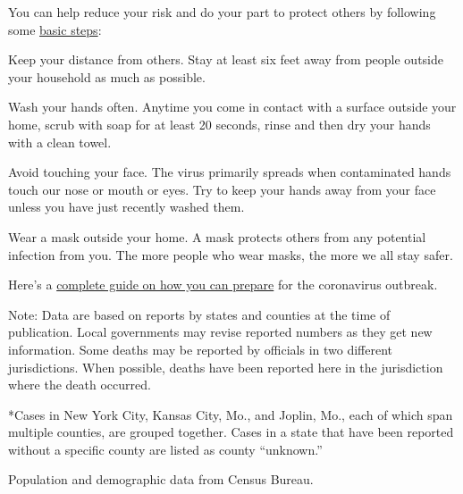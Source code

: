 You can help reduce your risk and do your part to protect others by
following some
\href{https://www.nytimes.com/article/prepare-for-coronavirus.html?action=click\&pgtype=Article\&state=default\&module=styln-coronavirus\&variant=show®ion=TOP_BANNER\&context=storyline_menu\#link-56871453}{basic
steps}:

Keep your distance from others. Stay at least six feet away from people
outside your household as much as possible.

Wash your hands often. Anytime you come in contact with a surface
outside your home, scrub with soap for at least 20 seconds, rinse and
then dry your hands with a clean towel.

Avoid touching your face. The virus primarily spreads when contaminated
hands touch our nose or mouth or eyes. Try to keep your hands away from
your face unless you have just recently washed them.

Wear a mask outside your home. A mask protects others from any potential
infection from you. The more people who wear masks, the more we all stay
safer.

Here's a
\href{https://www.nytimes.com/interactive/2020/world/coronavirus-tips-advice.html}{complete
guide on how you can prepare} for the coronavirus outbreak.

Note: Data are based on reports by states and counties at the time of
publication. Local governments may revise reported numbers as they get
new information. Some deaths may be reported by officials in two
different jurisdictions. When possible, deaths have been reported here
in the jurisdiction where the death occurred.

*Cases in New York City, Kansas City, Mo., and Joplin, Mo., each of
which span multiple counties, are grouped together. Cases in a state
that have been reported without a specific county are listed as county
``unknown.''

Population and demographic data from Census Bureau.

